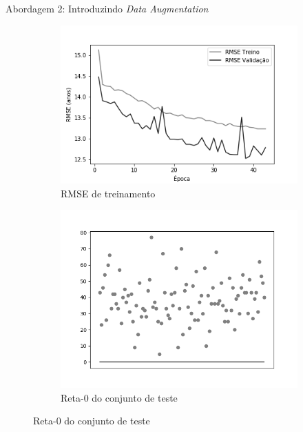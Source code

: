 \begin{frame}{\large{Abordagem 2: Introduzindo \emph{Data Augmentation}}}
\begin{figure}[h!]
  \caption{Resultados do treinamento e teste da CNN LeNet \emph{ReLU}}
  \begin{subfigure}[hb]{0.4\textwidth}
    \caption{RMSE de treinamento}
    \includegraphics[width=\linewidth]{img/graficos/history/lenet/fig-history-image-treat-2-lenet-relu-rmse.png}%
  \end{subfigure}%
  \begin{subfigure}[hb]{0.4\textwidth}
    \caption{Reta-0 do conjunto de teste}
    \includegraphics[width=\linewidth]{img/graficos/reta0/lenet/fig-reta-0-image-treat-2-lenet-relu.png}%
  \end{subfigure}
\end{figure}
\end{frame}

